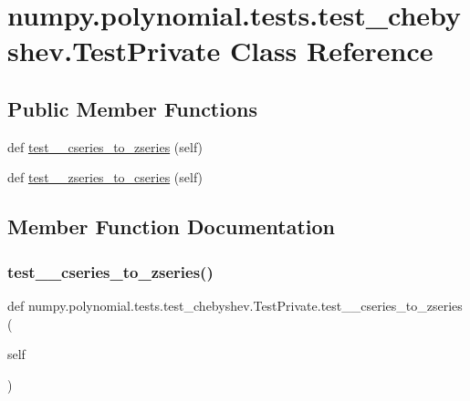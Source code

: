 \hypertarget{classnumpy_1_1polynomial_1_1tests_1_1test__chebyshev_1_1TestPrivate}{}\section{numpy.\+polynomial.\+tests.\+test\+\_\+chebyshev.\+Test\+Private Class Reference}
\label{classnumpy_1_1polynomial_1_1tests_1_1test__chebyshev_1_1TestPrivate}
\subsection*{Public Member Functions}
\begin{DoxyCompactItemize}
\item 
def \hyperlink{classnumpy_1_1polynomial_1_1tests_1_1test__chebyshev_1_1TestPrivate_a176adac331d9505fdc1ad72e7c839c22}{test\+\_\+\+\_\+cseries\+\_\+to\+\_\+zseries} (self)
\item 
def \hyperlink{classnumpy_1_1polynomial_1_1tests_1_1test__chebyshev_1_1TestPrivate_aaafdb817bb057bc1d25a34bee0576ddf}{test\+\_\+\+\_\+zseries\+\_\+to\+\_\+cseries} (self)
\end{DoxyCompactItemize}


\subsection{Member Function Documentation}
\mbox{\label{classnumpy_1_1polynomial_1_1tests_1_1test__chebyshev_1_1TestPrivate_a176adac331d9505fdc1ad72e7c839c22}} 
\subsubsection{\texorpdfstring{test\+\_\+\+\_\+cseries\+\_\+to\+\_\+zseries()}{test\_\_cseries\_to\_zseries()}}
{\footnotesize\ttfamily def numpy.\+polynomial.\+tests.\+test\+\_\+chebyshev.\+Test\+Private.\+test\+\_\+\+\_\+cseries\+\_\+to\+\_\+zseries (\begin{DoxyParamCaption}\item[{}]{self }\end{DoxyParamCaption})}

